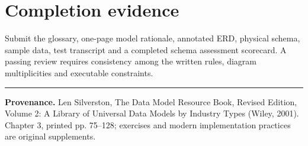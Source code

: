 \documentclass[11pt,letterpaper]{article}
\begin{document}
\section{Completion evidence}
Submit the glossary, one-page model rationale, annotated ERD, physical schema, sample data, test transcript and a completed schema assessment scorecard. A passing review requires consistency among the written rules, diagram multiplicities and executable constraints.


\vfill
\hrule
{\footnotesize\textbf{Provenance.} Len Silverston, The Data Model Resource Book, Revised Edition, Volume 2: A Library of Universal Data Models by Industry Types (Wiley, 2001). Chapter 3, printed pp. 75--128; exercises and modern implementation practices are original supplements.}
\end{document}
